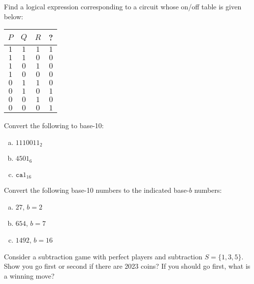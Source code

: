 \documentclass[12pt,letterpaper]{exam}
\begin{document}
\begin{questions}
\newpage
\question[10] Find a logical expression corresponding to a circuit whose on/off table is given below: \par
	\begin{table}[h]
	\centering
	\begin{tabular}{c|c|c|c}
	$P$ & $Q$ & $R$ & ? \\ \hline
	$1$ & $1$ & $1$ & $1$ \\
	$1$ & $1$ & $0$ & $0$ \\
	$1$ & $0$ & $1$ & $0$ \\
	$1$ & $0$ & $0$ & $0$ \\
	$0$ & $1$ & $1$ & $0$ \\
	$0$ & $1$ & $0$ & $1$ \\
	$0$ & $0$ & $1$ & $0$ \\
	$0$ & $0$ & $0$ & $1$
	\end{tabular}
	\end{table}



\newpage
\question[10] Convert the following to base-10:
	\begin{enumerate}[(a)]
	\item $1110011_2$
	\item $4501_6$
	\item $\texttt{ca}1_{16}$
	\end{enumerate}



\newpage
\question[10] Convert the following base-10 numbers to the indicated base-$b$ numbers:
	\begin{enumerate}[(a)]
	\item $27$, $b= 2$
	\item $654$, $b= 7$
	\item $1492$, $b= 16$
	\end{enumerate}



\newpage
\question[10] Consider a subtraction game with perfect players and subtraction $S= \{ 1, 3, 5 \}$. Show you go first or second if there are 2023 coins? If you should go first, what is a winning move? 




\end{questions}
\end{document}
